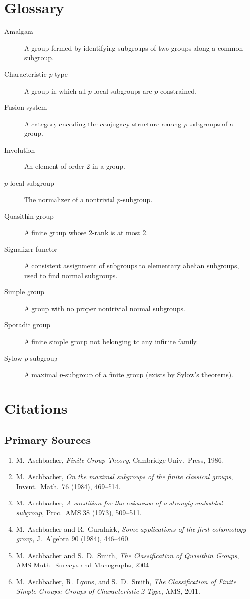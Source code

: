 \section*{Glossary}

\begin{description}
    \item[Amalgam] A group formed by identifying subgroups of two groups along a common subgroup.
    \item[Characteristic $p$-type] A group in which all $p$-local subgroups are $p$-constrained.
    \item[Fusion system] A category encoding the conjugacy structure among $p$-subgroups of a group.
    \item[Involution] An element of order 2 in a group.
    \item[$p$-local subgroup] The normalizer of a nontrivial $p$-subgroup.
    \item[Quasithin group] A finite group whose 2-rank is at most 2.
    \item[Signalizer functor] A consistent assignment of subgroups to elementary abelian subgroups, used to find normal subgroups.
    \item[Simple group] A group with no proper nontrivial normal subgroups.
    \item[Sporadic group] A finite simple group not belonging to any infinite family.
    \item[Sylow $p$-subgroup] A maximal $p$-subgroup of a finite group (exists by Sylow's theorems).
\end{description}

\section{Citations}\subsection*{Primary Sources}
\begin{enumerate}
    \item M.\ Aschbacher, \textit{Finite Group Theory}, Cambridge Univ.\ Press, 1986.
    \item M.\ Aschbacher, \textit{On the maximal subgroups of the finite classical groups}, Invent.\ Math.\ 76 (1984), 469--514.
    \item M.\ Aschbacher, \textit{A condition for the existence of a strongly embedded subgroup}, Proc.\ AMS 38 (1973), 509--511.
    \item M.\ Aschbacher and R.\ Guralnick, \textit{Some applications of the first cohomology group}, J.\ Algebra 90 (1984), 446--460.
    \item M.\ Aschbacher and S.\ D.\ Smith, \textit{The Classification of Quasithin Groups}, AMS Math.\ Surveys and Monographs, 2004.
    \item M.\ Aschbacher, R.\ Lyons, and S.\ D.\ Smith, \textit{The Classification of Finite Simple Groups: Groups of Characteristic 2-Type}, AMS, 2011.
\end{enumerate}

